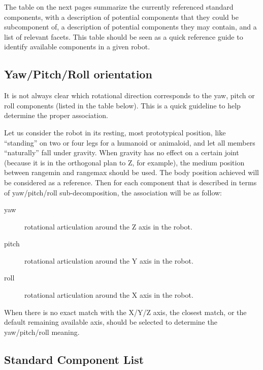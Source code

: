 The table on the next pages summarize the currently referenced standard
components, with a description of potential components that they could
be subcomponent of, a description of potential components they may
contain, and a list of relevant facets. This table should be seen as a
quick reference guide to identify available components in a given
robot.

\subsection{Yaw/Pitch/Roll orientation}
\label{sec:naming:ypr}

It is not always clear which rotational direction corresponds to the
yaw, pitch or roll components (listed in the table below). This is a
quick guideline to help determine the proper association.

Let us consider the robot in its resting, most prototypical position,
like ``standing'' on two or four legs for a humanoid or animaloid, and
let all members ``naturally'' fall under gravity. When gravity has no
effect on a certain joint (because it is in the orthogonal plan to Z,
for example), the medium position between rangemin and rangemax should
be used. The body position achieved will be considered as a reference.
Then for each component that is described in terms of yaw/pitch/roll
sub-decomposition, the association will be as follow:

\begin{description}
\item[yaw] rotational articulation around the Z axis in the robot.
\item[pitch] rotational articulation around the Y axis in the robot.
\item[roll] rotational articulation around the X axis in the robot.
\end{description}

When there is no exact match with the X/Y/Z axis, the closest match, or
the default remaining available axis, should be selected to determine
the yaw/pitch/roll meaning.

\subsection{Standard Component List}
\label{sec:naming:components}

\newcommand{\component}[5]
{
  \lstindex{#1} &
  #5 &
  \code{#2} &
  \code{#3} &
  \code{#4}\\\hline
}

